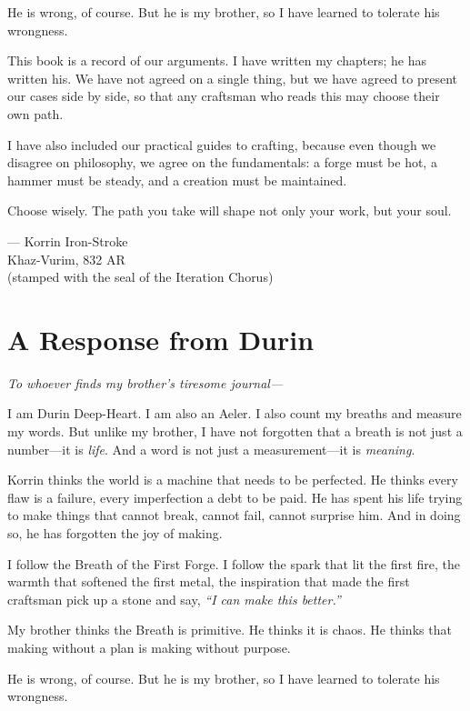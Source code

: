 \documentclass[11pt]{book}
\begin{document}
He is wrong, of course. But he is my brother, so I have learned to tolerate his wrongness.

This book is a record of our arguments. I have written my chapters; he has written his. We have not agreed on a single thing, but we have agreed to present our cases side by side, so that any craftsman who reads this may choose their own path.

I have also included our practical guides to crafting, because even though we disagree on philosophy, we agree on the fundamentals: a forge must be hot, a hammer must be steady, and a creation must be maintained.

Choose wisely. The path you take will shape not only your work, but your soul.

\vspace{0.5cm}
\hfill --- Korrin Iron-Stroke \\
\hfill Khaz-Vurim, 832 AR \\
\hfill (stamped with the seal of the Iteration Chorus)

\newpage
\section*{A Response from Durin}

\emph{To whoever finds my brother's tiresome journal---}

I am Durin Deep-Heart. I am also an Aeler. I also count my breaths and measure my words. But unlike my brother, I have not forgotten that a breath is not just a number---it is \textit{life}. And a word is not just a measurement---it is \textit{meaning}.

Korrin thinks the world is a machine that needs to be perfected. He thinks every flaw is a failure, every imperfection a debt to be paid. He has spent his life trying to make things that cannot break, cannot fail, cannot surprise him. And in doing so, he has forgotten the joy of making.

I follow the Breath of the First Forge. I follow the spark that lit the first fire, the warmth that softened the first metal, the inspiration that made the first craftsman pick up a stone and say, \textit{``I can make this better.''} 

My brother thinks the Breath is primitive. He thinks it is chaos. He thinks that making without a plan is making without purpose.

He is wrong, of course. But he is my brother, so I have learned to tolerate his wrongness.
\end{document}
